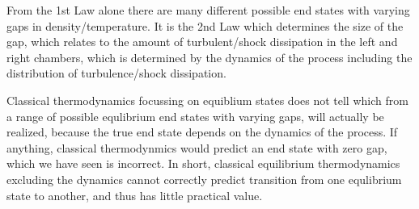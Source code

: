 


From the 1st Law alone there are many different possible end states with varying gaps in density/temperature. 
It is the 2nd Law which determines the size of the gap, which relates to the amount of turbulent/shock dissipation
in the left and right chambers, which is determined by the dynamics of the process including 
the distribution of turbulence/shock dissipation. 

Classical thermodynamics focussing on equiblium states does not tell which from a range of 
possible equlibrium end states with varying gaps, will actually be realized, because the true end state depends on the dynamics
of the process. If anything, classical thermodynmics would predict an end state with zero gap, 
which we have seen is incorrect.
In short, classical equilibrium thermodynamics excluding the dynamics cannot correctly
predict transition from one equlibrium state to another, and thus has little practical value. 
  

  



